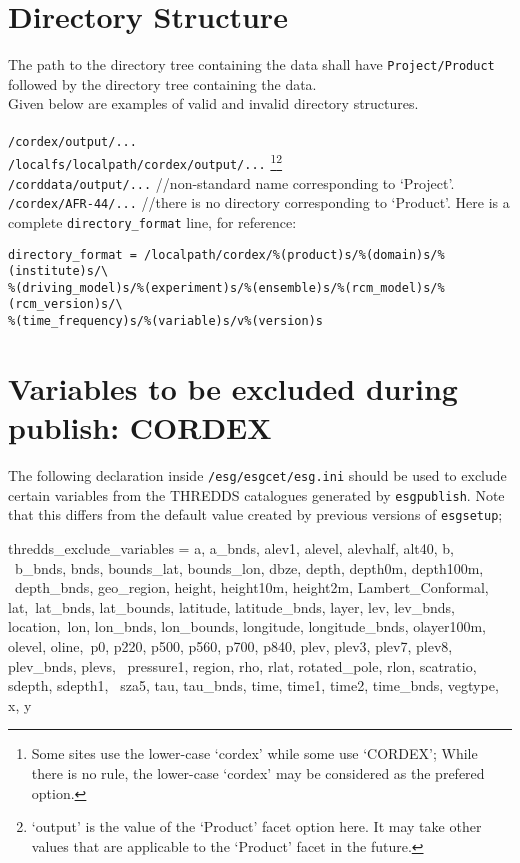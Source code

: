\section{Directory Structure}
The path to the directory tree containing the data shall have \texttt{Project/Product} followed by the directory tree containing the data. \\
Given below are examples of valid and invalid directory structures.\\
\vspace{0mm}\\
\texttt{/cordex/output/...} \cmark\\
\texttt{/localfs/localpath/cordex/output/...} \cmark \footnote{Some sites use the lower-case `cordex' while some use `CORDEX'; While there is no rule, the lower-case `cordex' may be considered as the prefered option.}\footnote{`output' is the value of the `Product' facet option here. It may take other values that are applicable to the `Product' facet in the future.} \\
\texttt{/corddata/output/...} \xmark{ } //non-standard name corresponding to `Project'.  \\ 
\texttt{/cordex/AFR-44/...} \xmark{ } //there is no directory corresponding to `Product'. Here is a complete \texttt{directory\_format} line, for reference:
\begin{verbatim}
directory_format = /localpath/cordex/%(product)s/%(domain)s/%(institute)s/\
%(driving_model)s/%(experiment)s/%(ensemble)s/%(rcm_model)s/%(rcm_version)s/\
%(time_frequency)s/%(variable)s/v%(version)s
\end{verbatim}

\section{Variables to be excluded during publish: CORDEX}

The following declaration inside \texttt{/esg/esgcet/esg.ini} should be used to exclude certain variables from the THREDDS catalogues generated by \texttt{esgpublish}.  Note that this differs from the default value created by previous versions of \texttt{esgsetup}; 

\begin{verbatimtab}[4]
thredds_exclude_variables = a, a_bnds, alev1, alevel, alevhalf, alt40, b, \
b_bnds, bnds, bounds_lat, bounds_lon, dbze, depth, depth0m, depth100m, \
depth_bnds, geo_region, height, height10m, height2m, Lambert_Conformal, lat,\
lat_bnds, lat_bounds, latitude, latitude_bnds, layer, lev, lev_bnds, location,\
lon, lon_bnds, lon_bounds, longitude, longitude_bnds, olayer100m, olevel, oline,\
p0, p220, p500, p560, p700, p840, plev, plev3, plev7, plev8, plev_bnds, plevs, \
pressure1, region, rho, rlat, rotated_pole, rlon, scatratio, sdepth, sdepth1, \
sza5, tau, tau_bnds, time, time1, time2, time_bnds, vegtype, x, y
\end{verbatimtab}

